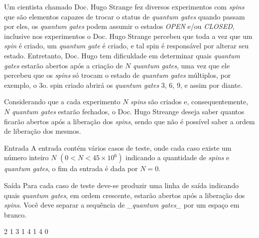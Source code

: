 Um cientista chamado Doc. Hugo Strange fez diversos experimentos com \textit{spins} que são elementos capazes de trocar o status de \textit{quantum gates} quando passam por eles, os \textit{quantum gates} podem assumir o estados \textit{OPEN} e/ou \textit{CLOSED}, inclusive nos experimentos o Doc. Hugo Strange percebeu que toda a vez que um \textit{spin} é criado, um \textit{quantum gate} é criado, e tal spin é responsável por alterar seu estado. Entretanto, Doc. Hugo tem dificuldade em
determinar quais \textit{quantum gates} estarão abertos
após a criação de $N$ \textit{quantum gates}, uma vez que ele percebeu que os \textit{spins} só trocam o estado de \textit{quantum gates} múltiplos, por exemplo, o 3o. spin criado abrirá os \textit{quantum gates} 3, 6, 9, e assim por diante.

Considerando que a cada experimento $N$ \textit{spins} são criados e, consequentemente, $N$ \textit{quantum gates} estarão fechados, o Doc. Hugo Streange deseja saber quantos ficarão abertos após a liberação dos \textit{spins}, sendo que não é possível saber a ordem de liberação dos mesmos.

Entrada
A entrada contém vários casos de teste, onde cada caso existe um número inteiro $N$ $(0 < N < 45\times 10^{6})$ indicando a quantidade de \textit{spins} e \textit{quantum gates}, o fim da entrada é dada por $N=0$.

Saída
Para cada caso de teste deve-se produzir uma linha de saída indicando quais \textit{quantum gates}, em ordem crescente, estarão abertos após a liberação dos \textit{spins}. Você deve separar a sequência de \textit{_quantum gates_} por um espaço em branco.

2                        1
3                        1
4                        1 4
0
